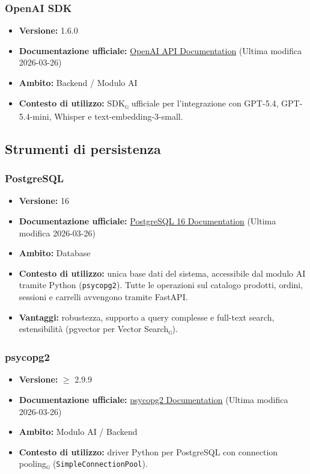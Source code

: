 \documentclass[a4paper, 11pt, oneside]{scrartcl}
\begin{document}
\subsubsection{OpenAI SDK}
\begin{itemize}[noitemsep]
\item \textbf{Versione:} 1.6.0
\item \textbf{Documentazione ufficiale:} \href{https://platform.openai.com/docs}{OpenAI API Documentation} (Ultima modifica 2026-03-26)
\item \textbf{Ambito:} Backend / Modulo AI
\item \textbf{Contesto di utilizzo:} SDK\textsubscript{\textsc{g}} ufficiale per l'integrazione con GPT-5.4, GPT-5.4-mini, Whisper e text-embedding-3-small.
\end{itemize}

\subsection{Strumenti di persistenza}

\subsubsection{PostgreSQL}
\begin{itemize}[noitemsep]
\item \textbf{Versione:} 16
\item \textbf{Documentazione ufficiale:} \href{https://www.postgresql.org/docs/16/}{PostgreSQL 16 Documentation} (Ultima modifica 2026-03-26)
\item \textbf{Ambito:} Database
\item \textbf{Contesto di utilizzo:} unica base dati del sistema, accessibile dal modulo AI tramite Python (\texttt{psycopg2}). Tutte le operazioni sul catalogo prodotti, ordini, sessioni e carrelli avvengono tramite FastAPI.
\item \textbf{Vantaggi:} robustezza, supporto a query complesse e full-text search, estensibilit\`a (pgvector per Vector Search\textsubscript{\textsc{g}}).
\end{itemize}

\subsubsection{psycopg2}
\begin{itemize}[noitemsep]
\item \textbf{Versione:} $\geq$ 2.9.9
\item \textbf{Documentazione ufficiale:} \href{https://www.psycopg.org/docs/}{psycopg2 Documentation} (Ultima modifica 2026-03-26)
\item \textbf{Ambito:} Modulo AI / Backend
\item \textbf{Contesto di utilizzo:} driver Python per PostgreSQL con connection pooling\textsubscript{\textsc{g}} (\texttt{SimpleConnectionPool}).
\end{itemize}
\end{document}
